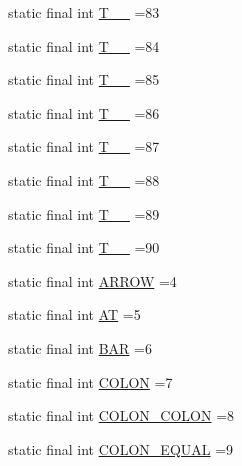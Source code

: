 \begin{DoxyCompactItemize}
\item 
static final int \hyperlink{classorg_1_1tzi_1_1use_1_1parser_1_1soil_1_1_soil_parser_a0963f1929c3c522bb4d2754c9ab334bf}{T\-\_\-\-\_} =83
\item 
static final int \hyperlink{classorg_1_1tzi_1_1use_1_1parser_1_1soil_1_1_soil_parser_ad1d6f3588c1aab9dcbaaa8076a6a227f}{T\-\_\-\-\_} =84
\item 
static final int \hyperlink{classorg_1_1tzi_1_1use_1_1parser_1_1soil_1_1_soil_parser_aafb5de3032899e7532b9605c34b57edb}{T\-\_\-\-\_} =85
\item 
static final int \hyperlink{classorg_1_1tzi_1_1use_1_1parser_1_1soil_1_1_soil_parser_a87099b8051fcec4422fd1f3a62541186}{T\-\_\-\-\_} =86
\item 
static final int \hyperlink{classorg_1_1tzi_1_1use_1_1parser_1_1soil_1_1_soil_parser_adb75d31b47b929fbef66bc831a4a19ac}{T\-\_\-\-\_} =87
\item 
static final int \hyperlink{classorg_1_1tzi_1_1use_1_1parser_1_1soil_1_1_soil_parser_a6194e99d44c46ddca8e7282a6a34dbea}{T\-\_\-\-\_} =88
\item 
static final int \hyperlink{classorg_1_1tzi_1_1use_1_1parser_1_1soil_1_1_soil_parser_a1637cc76b5c3fb2add8292f78ec7c465}{T\-\_\-\-\_} =89
\item 
static final int \hyperlink{classorg_1_1tzi_1_1use_1_1parser_1_1soil_1_1_soil_parser_aa6cf583640eeea0158b643296acef0ee}{T\-\_\-\-\_} =90
\item 
static final int \hyperlink{classorg_1_1tzi_1_1use_1_1parser_1_1soil_1_1_soil_parser_a2a756d3b37556356e15efcb7e79ca27a}{A\-R\-R\-O\-W} =4
\item 
static final int \hyperlink{classorg_1_1tzi_1_1use_1_1parser_1_1soil_1_1_soil_parser_a8a1c7b60ae3b9490e4740f629a5f675e}{A\-T} =5
\item 
static final int \hyperlink{classorg_1_1tzi_1_1use_1_1parser_1_1soil_1_1_soil_parser_a17f84816fb78f6cc2413246259844e7e}{B\-A\-R} =6
\item 
static final int \hyperlink{classorg_1_1tzi_1_1use_1_1parser_1_1soil_1_1_soil_parser_a9d45d37b86bf877582c5e0fea1344440}{C\-O\-L\-O\-N} =7
\item 
static final int \hyperlink{classorg_1_1tzi_1_1use_1_1parser_1_1soil_1_1_soil_parser_aafb0f0c6ee4a6aa3af2a3b644ec9dcf2}{C\-O\-L\-O\-N\-\_\-\-C\-O\-L\-O\-N} =8
\item 
static final int \hyperlink{classorg_1_1tzi_1_1use_1_1parser_1_1soil_1_1_soil_parser_ae1273bb85792cae53d022cb57ddd9991}{C\-O\-L\-O\-N\-\_\-\-E\-Q\-U\-A\-L} =9

\end{DoxyCompactItemize}
